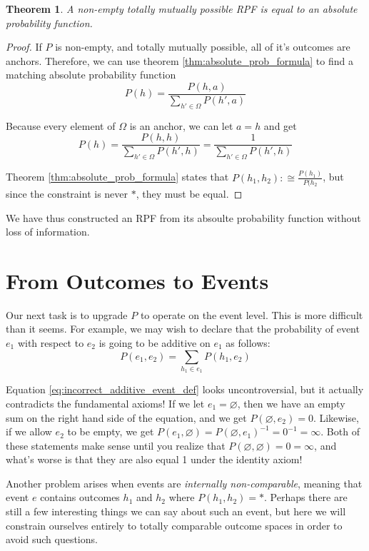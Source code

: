 \documentclass[twoside]{article}
\theoremstyle{plain}%
\newtheorem{theorem}{Theorem}[section]
\theoremstyle{definition}
\theoremstyle{remark}
\begin{document}
\begin{theorem}
A non-empty totally mutually possible RPF is equal to an absolute probability function.
\end{theorem}

\begin{proof}
If \(P\) is non-empty, and totally mutually possible, all of it's outcomes are anchors. Therefore, we can use theorem \ref{thm:absolute_prob_formula} to find a matching absolute probability function
\[P(h) = \frac{P(h, a)}{\sum_{h' \in \Omega}P(h', a)}\]

Because every element of \(\Omega\) is an anchor, we can let \(a = h\) and get
\[P(h) = \frac{P(h, h)}{\sum_{h' \in \Omega}P(h', h)}=\frac{1}{\sum_{h' \in \Omega}P(h', h)}\]

Theorem \ref{thm:absolute_prob_formula} states that \(P(h_1, h_2) :\cong \frac{P(h_1)}{P(h_2}\), but since the constraint is never \(\ast\), they must be equal.
\end{proof}

We have thus constructed an RPF from its absoulte probability function without loss of information.

\section{From Outcomes to Events}

Our next task is to upgrade \(P\) to operate on the event level. This is more difficult than it seems. For example, we may wish to declare that the probability of event \(e_1\) with respect to \(e_2\) is going to be additive on \(e_1\) as follows:
\begin{equation}
\label{eq:incorrect_additive_event_def}
P(e_1, e_2) = \sum_{h_1 \in e_1}P(h_1, e_2)
\end{equation}

Equation \ref{eq:incorrect_additive_event_def} looks uncontroversial, but it actually contradicts the fundamental axioms! If we let \(e_1 = \varnothing\), then we have an empty sum on the right hand side of the equation, and we get \(P(\varnothing, e_2) = 0\). Likewise, if we allow \(e_2\) to be empty, we get \(P(e_1, \varnothing) = P(\varnothing, e_1)^{-1}=0^{-1}=\infty\). Both of these statements make sense until you realize that \(P(\varnothing, \varnothing) = 0 = \infty\), and what's worse is that they are also equal 1 under the identity axiom!

Another problem arises when events are \textit{internally non-comparable}, meaning that event \(e\) contains outcomes \(h_1\) and \(h_2\) where \(P(h_1, h_2) = \ast\). Perhaps there are still a few interesting things we can say about such an event, but here we will constrain ourselves entirely to totally comparable outcome spaces in order to avoid such questions.
\end{document}
